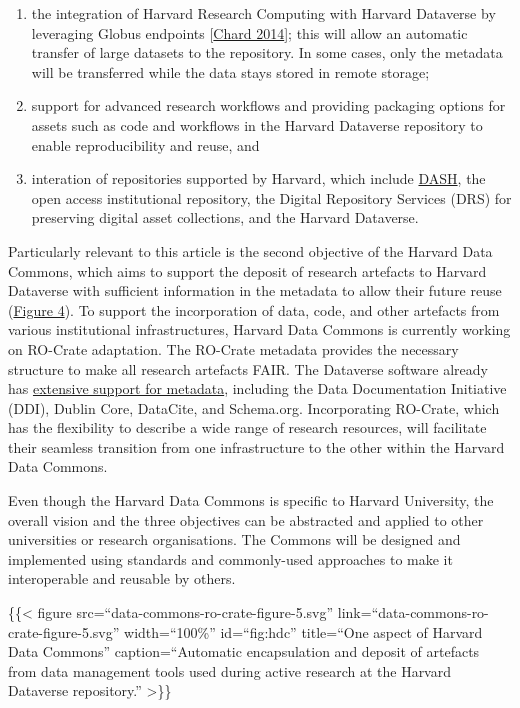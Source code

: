 \begin{enumerate}
\def\labelenumi{\arabic{enumi}.}
\tightlist
\item
  the integration of Harvard Research Computing with Harvard Dataverse
  by leveraging Globus endpoints
  {[}\href{https://doi.org/10.1109/MCC.2014.52}{Chard 2014}{]}; this will allow
  an automatic transfer of large datasets to the repository. In some
  cases, only the metadata will be transferred while the data stays
  stored in remote storage;
\item
  support for advanced research workflows and providing packaging
  options for assets such as code and workflows in the Harvard Dataverse
  repository to enable reproducibility and reuse, and
\item
  interation of repositories supported by Harvard, which include
  \href{https://dash.harvard.edu/}{DASH}, the open access institutional
  repository, the Digital Repository Services (DRS) for preserving
  digital asset collections, and the Harvard Dataverse.
\end{enumerate}

Particularly relevant to this article is the second objective of the
Harvard Data Commons, which aims to support the deposit of research
artefacts to Harvard Dataverse with sufficient information in the
metadata to allow their future reuse (\protect\hyperlink{fig:hdc}{Figure
4}). To support the incorporation of data, code, and other artefacts
from various institutional infrastructures, Harvard Data Commons is
currently working on RO-Crate adaptation. The RO-Crate metadata provides
the necessary structure to make all research artefacts FAIR. The
Dataverse software already has
\href{https://guides.dataverse.org/en/latest/user/appendix.html}{extensive
support for metadata}, including the Data Documentation Initiative
(DDI), Dublin Core, DataCite, and Schema.org. Incorporating RO-Crate,
which has the flexibility to describe a wide range of research
resources, will facilitate their seamless transition from one
infrastructure to the other within the Harvard Data Commons.

Even though the Harvard Data Commons is specific to Harvard University,
the overall vision and the three objectives can be abstracted and
applied to other universities or research organisations. The Commons
will be designed and implemented using standards and commonly-used
approaches to make it interoperable and reusable by others.

\{\{\textless{} figure src=``data-commons-ro-crate-figure-5.svg''
link=``data-commons-ro-crate-figure-5.svg'' width=``100\%''
id=``fig:hdc'' title=``One aspect of Harvard Data Commons''
caption=``Automatic encapsulation and deposit of artefacts from data
management tools used during active research at the Harvard Dataverse
repository.'' \textgreater\}\}

